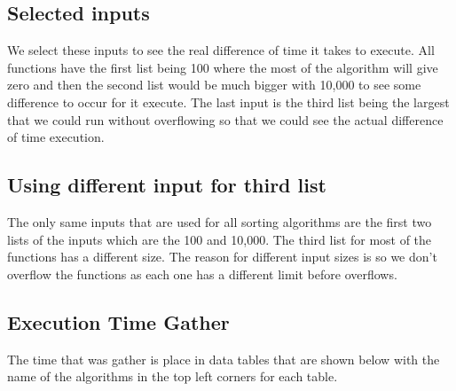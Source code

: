 \documentclass[12pt]{article}
\begin{document}
	\subsection{Selected inputs}
	We select these inputs to see the real difference of time it takes to execute. All functions have the first list being 100 where the most of the algorithm will give zero and then the second list would be much bigger with 10,000 to see some difference to occur for it execute. The last input is the third list being the largest that we could run without overflowing so that we could see the actual difference of time execution.
	\subsection{Using different input for third list}
	The only same inputs that are used for all sorting algorithms are the first two lists of the inputs which are the 100 and 10,000. The third list for most of the functions has a different size. The reason for different input sizes is so we don't overflow the functions as each one has a different limit before overflows.
	\subsection{Execution Time Gather}
	The time that was gather is place in data tables that are shown below with the name of the algorithms in the top left corners for each table. 
	\indent \\ \\ \\ \\ \\ \\ \\ \\ \\
\end{document}
